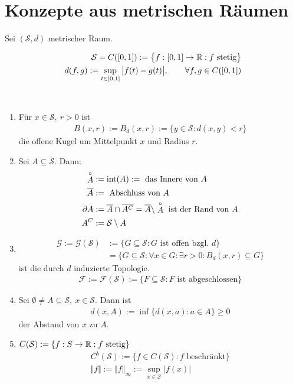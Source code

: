 \section{Konzepte aus metrischen Räumen}
Sei $(\mathcal{S},d)$ metrischer Raum.

\begin{beispiel} %
\begin{align*}
\mathcal{S}=C([0,1]):=\big\lbrace f:[0,1]\to\mathbb{R}: f\text{ stetig}\big\rbrace\\
d(f,g):=\sup\limits_{t\in[0,1]}\big|f(t)-g(t)\big|,\qquad\forall f,g\in C([0,1])
\end{align*}
\end{beispiel}

\begin{definition}\
\begin{enumerate}[label={(\arabic*)}]
\item Für $x\in\mathcal{S},~r>0$ ist
\begin{align*}
B(x,r):=B_d(x,r):=\lbrace y\in\mathcal{S}:d(x,y)<r\rbrace
\end{align*}
die offene Kugel um Mittelpunkt $x$ und Radius $r$.
\item Sei $A\subseteq\mathcal{S}$. Dann:
\begin{align*}
\stackrel{\circ}{A}&:=\operatorname{int}(A):=\text{ das Innere von }A\\
\overline{A}&:=\text{ Abschluss von }A\\
\partial A&:=\overline{A}\cap\overline{A^C}=\overline{A}\setminus\stackrel{\circ}{A}\text{ ist der Rand von }A\\
A^C&:=\mathcal{S}\setminus A
\end{align*}
\item \begin{align*}
\mathcal{G}:=\mathcal{G}(\mathcal{S})&:=\big\lbrace G\subseteq\mathcal{S}: G\text{ ist offen bzgl. }d\big\rbrace\\
&=\big\lbrace G\subseteq\mathcal{S}:\forall x\in G:\exists r>0:B_d(x,r)\subseteq G\big\rbrace
\end{align*}
ist die durch $d$ induzierte Topologie.
\begin{align*}
\mathcal{F}:=\mathcal{F}(\mathcal{S}):=\big\lbrace F\subseteq\mathcal{S}:F\text{ ist abgeschlossen}\big\rbrace
\end{align*}
\item Sei $\emptyset\neq A\subseteq\mathcal{S},~x\in\mathcal{S}$. Dann ist
\begin{align*}
d(x,A):=\inf\lbrace d(x,a):a\in A\rbrace\geq0
\end{align*}
der Abstand von $x$ zu $A$.
\item $C(\mathcal{S}):=\lbrace f:S\to\mathbb{R}:f\text{ stetig}\rbrace$
\begin{align*}
C^b(\mathcal{S}):=\lbrace f\in C(\mathcal{S}):f\text{ beschränkt}\rbrace\\
\Vert f\Vert:=\Vert f\Vert_\infty:=\sup\limits_{x\in\mathcal{S}}|f(x)|
\end{align*}
\end{enumerate}
\end{definition}

